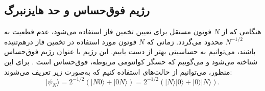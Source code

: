 \subsection{رژیم فوق‌حساس و حد هایزنبرگ}
\label{subsec:11-1-2}
هنگامی که از $N$ فوتون مستقل برای تعیین تخمین فاز استفاده می‌شود، عدم قطعیت به $N^{-1/2}$ محدود می‌گردد. زمانی که $N$ فوتون مورد استفاده در تخمین فاز درهم‌تنیده باشند، می‌توانیم به حساسیتی بهتر از  دست یابیم. این رژیم با عنوان رژیم فوق‌حساس شناخته می‌شود و می‌گوییم که حسگر کوانتومی مربوطه، فوق‌حساس است \cite{7}.
برای این منظور، می‌توانیم از حالت‌های  استفاده کنیم که به‌صورت زیر تعریف می‌شوند:
\begin{equation}
	|\psi_N\rangle = 2^{-1/2}(|N0\rangle + |0N\rangle) = 2^{-1/2}(|N\rangle |0\rangle + |0\rangle |N\rangle).
	\label{eq:11-30}
\end{equation}

